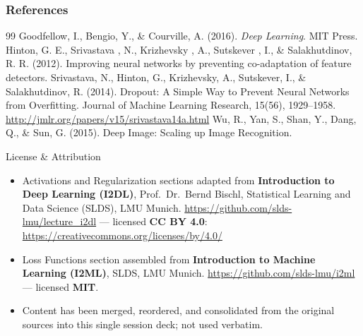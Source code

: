 \begin{vbframe}
\frametitle{References}
\footnotesize{
\begin{thebibliography}{99}
 Goodfellow, I., Bengio, Y., \& Courville, A. (2016). \textit{Deep Learning}. MIT Press. 
 Hinton, G. E., Srivastava , N., Krizhevsky , A., Sutskever , I., \& Salakhutdinov, R. R. (2012). Improving neural networks by preventing co-adaptation of feature detectors. 
     Srivastava, N., Hinton, G., Krizhevsky, A., Sutskever, I., \& Salakhutdinov, R. (2014). Dropout: A Simple Way to Prevent Neural Networks from Overfitting. Journal of Machine Learning Research, 15(56), 1929–1958. \url{http://jmlr.org/papers/v15/srivastava14a.html}
 Wu, R., Yan, S., Shan, Y., Dang, Q., \& Sun, G. (2015). Deep Image: Scaling up Image Recognition. 


\end{thebibliography}
}
\end{vbframe}

\begin{vbframe}{License \& Attribution}
\begin{itemize}
\item Activations and Regularization sections adapted from
\textbf{Introduction to Deep Learning (I2DL)}, Prof.\ Dr.\ Bernd Bischl,
Statistical Learning and Data Science (SLDS), LMU Munich.
\url{https://github.com/slds-lmu/lecture_i2dl} --- licensed
\textbf{CC BY 4.0}: \url{https://creativecommons.org/licenses/by/4.0/}
\item Loss Functions section assembled from \textbf{Introduction to Machine
Learning (I2ML)}, SLDS, LMU Munich. \url{https://github.com/slds-lmu/i2ml}
--- licensed \textbf{MIT}.
\item Content has been merged, reordered, and consolidated from the
original sources into this single session deck; not used verbatim.
\end{itemize}
\end{vbframe}

\endlecture

